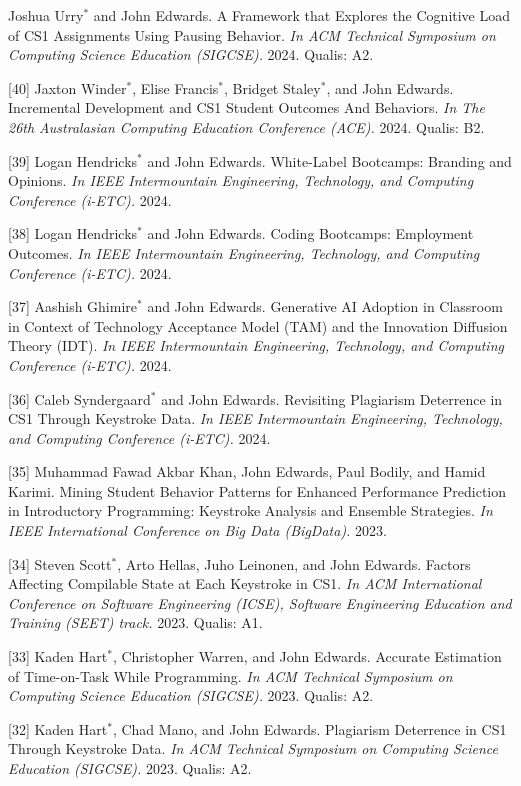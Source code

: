 \documentclass[margin,line]{res}
\newcommand{\cnum}[1]{[#1]}
\begin{document}
\begin{resume}
\cnum{41} Joshua Urry$^*$ and John Edwards. A Framework that Explores the Cognitive Load of CS1 Assignments Using Pausing Behavior. \textit{In ACM Technical Symposium on Computing Science Education (SIGCSE).} 2024. Qualis: A2.

\cnum{40} Jaxton Winder$^*$, Elise Francis$^*$, Bridget Staley$^*$, and John Edwards. Incremental Development and CS1 Student Outcomes And Behaviors. \textit{In The 26th Australasian Computing Education Conference (ACE).} 2024. Qualis: B2.

\cnum{39} Logan Hendricks$^*$ and John Edwards. White-Label Bootcamps: Branding and Opinions. \textit{In IEEE Intermountain Engineering, Technology, and Computing Conference (i-ETC).} 2024.

\cnum{38} Logan Hendricks$^*$ and John Edwards. Coding Bootcamps: Employment Outcomes. \textit{In IEEE Intermountain Engineering, Technology, and Computing Conference (i-ETC).} 2024.

\cnum{37} Aashish Ghimire$^*$ and John Edwards. Generative AI Adoption in Classroom in Context of Technology Acceptance Model (TAM) and the Innovation Diffusion Theory (IDT). \textit{In IEEE Intermountain Engineering, Technology, and Computing Conference (i-ETC).} 2024.

\cnum{36} Caleb Syndergaard$^*$ and John Edwards. Revisiting Plagiarism Deterrence in CS1 Through Keystroke Data. \textit{In IEEE Intermountain Engineering, Technology, and Computing Conference (i-ETC).} 2024.

\cnum{35} Muhammad Fawad Akbar Khan, John Edwards, Paul Bodily, and Hamid Karimi. Mining Student Behavior Patterns for Enhanced Performance Prediction in Introductory Programming: Keystroke Analysis and Ensemble Strategies. \textit{In IEEE International Conference on Big Data (BigData).} 2023.

\cnum{34} Steven Scott$^*$, Arto Hellas, Juho Leinonen, and John Edwards. Factors Affecting Compilable State at Each Keystroke in CS1. \textit{In ACM International Conference on Software Engineering (ICSE), Software Engineering Education and Training (SEET) track.} 2023. Qualis: A1.

\cnum{33} Kaden Hart$^*$, Christopher Warren, and John Edwards. Accurate Estimation of Time-on-Task While Programming. \textit{In ACM Technical Symposium on Computing Science Education (SIGCSE).} 2023. Qualis: A2.

\cnum{32} Kaden Hart$^*$, Chad Mano, and John Edwards. Plagiarism Deterrence in CS1 Through Keystroke Data. \textit{In ACM Technical Symposium on Computing Science Education (SIGCSE).} 2023. Qualis: A2.


\end{resume}
\end{document}
